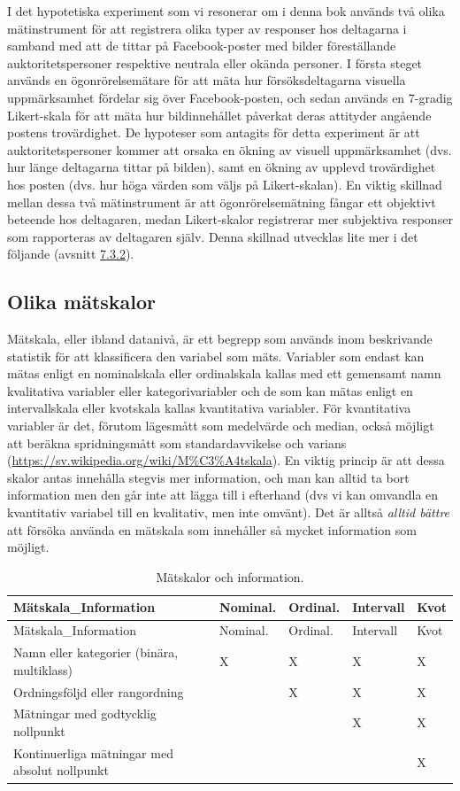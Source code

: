 \documentclass[
]{book}
\begin{document}
I det hypotetiska experiment som vi resonerar om i denna bok används två olika mätinstrument för att registrera olika typer av responser hos deltagarna i samband med att de tittar på Facebook-poster med bilder föreställande auktoritetspersoner respektive neutrala eller okända personer. I första steget används en ögonrörelsemätare för att mäta hur försöksdeltagarna visuella uppmärksamhet fördelar sig över Facebook-posten, och sedan används en 7-gradig Likert-skala för att mäta hur bildinnehållet påverkat deras attityder angående postens trovärdighet. De hypoteser som antagits för detta experiment är att auktoritetspersoner kommer att orsaka en ökning av visuell uppmärksamhet (dvs. hur länge deltagarna tittar på bilden), samt en ökning av upplevd trovärdighet hos posten (dvs. hur höga värden som väljs på Likert-skalan). En viktig skillnad mellan dessa två mätinstrument är att ögonrörelsemätning fångar ett objektivt beteende hos deltagaren, medan Likert-skalor registrerar mer subjektiva responser som rapporteras av deltagaren själv. Denna skillnad utvecklas lite mer i det följande (avsnitt \protect\hyperlink{sub07.3.2}{7.3.2}).

\hypertarget{sub07.3.1}{%
\subsection{Olika mätskalor}\label{sub07.3.1}}

Mätskala, eller ibland datanivå, är ett begrepp som används inom beskrivande statistik för att klassificera den variabel som mäts. Variabler som endast kan mätas enligt en nominalskala eller ordinalskala kallas med ett gemensamt namn kvalitativa variabler eller kategorivariabler och de som kan mätas enligt en intervallskala eller kvotskala kallas kvantitativa variabler. För kvantitativa variabler är det, förutom lägesmått som medelvärde och median, också möjligt att beräkna spridningsmått som standardavvikelse och varians (\url{https://sv.wikipedia.org/wiki/M\%C3\%A4tskala}). En viktig princip är att dessa skalor antas innehålla stegvis mer information, och man kan alltid ta bort information men den går inte att lägga till i efterhand (dvs vi kan omvandla en kvantitativ variabel till en kvalitativ, men inte omvänt). Det är alltså \emph{alltid bättre} att försöka använda en mätskala som innehåller så mycket information som möjligt.

\begin{longtable}[]{@{}lllll@{}}
\caption{\label{tab:tab-02-07-3-1-01}Mätskalor och information.}\tabularnewline
\toprule
Mätskala\_Information & Nominal. & Ordinal. & Intervall & Kvot\tabularnewline
\midrule
\endfirsthead
\toprule
Mätskala\_Information & Nominal. & Ordinal. & Intervall & Kvot\tabularnewline
\midrule
\endhead
Namn eller kategorier (binära, multiklass) & X & X & X & X\tabularnewline
Ordningsföljd eller rangordning & & X & X & X\tabularnewline
Mätningar med godtycklig nollpunkt & & & X & X\tabularnewline
Kontinuerliga mätningar med absolut nollpunkt & & & & X\tabularnewline
\bottomrule
\end{longtable}
\end{document}
